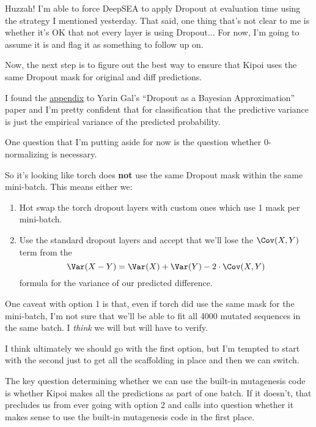 \begin{Minutes}{}
\maketitle
{}
Huzzah! I'm able to force DeepSEA to apply Dropout at evaluation time using the
strategy I mentioned yesterday. That said, one thing that's not clear to me is
whether it's OK that not every layer is using Dropout... For now, I'm going to
assume it is and flag it as something to follow up on.

Now, the next step is to figure out the best way to ensure that Kipoi uses the same Dropout mask for original and diff predictions. 

I found the \href{http://proceedings.mlr.press/v48/gal16-supp.pdf}{appendix} to Yarin Gal's ``Dropout as a Bayesian Approximation'' paper and I'm pretty confident that for classification that the predictive variance is just the empirical variance of the predicted probability.

One question that I'm putting aside for now is the question whether 0-normalizing is necessary.

So it's looking like torch does \textbf{not} use the same Dropout mask within the same mini-batch. This means either we:
\begin{enumerate}
    \item Hot swap the torch dropout layers with custom ones which use 1 mask per mini-batch.
    \item Use the standard dropout layers and accept that we'll lose the \( \Cov(X, Y) \) term from the
        \[ \Var(X - Y) = \Var(X) + \Var(Y) - 2 \cdot \Cov(X, Y) \]
        formula for the variance of our predicted difference.
\end{enumerate}
One caveat with option 1 is that, even if torch did use the same mask for the mini-batch, I'm not sure that we'll be able to fit all 4000 mutated sequences in the same batch. I \textit{think} we will but will have to verify.

I think ultimately we should go with the first option, but I'm tempted to start with the second just to get all the scaffolding in place and then we can switch.

The key question determining whether we can use the built-in mutagenesis code is whether Kipoi makes all the predictions as part of one batch. If it doesn't, that precludes us from ever going with option 2 and calls into question whether it makes sense to use the built-in mutagenesis code in the first place.

\end{Minutes}
